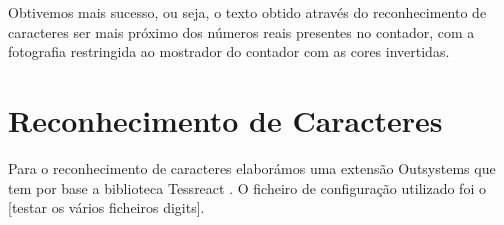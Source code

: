 Obtivemos mais sucesso, ou seja, o texto obtido através do reconhecimento de caracteres ser mais próximo dos números reais presentes no contador, com a fotografia restringida ao mostrador do contador com as cores invertidas.



\section{Reconhecimento de Caracteres} \label{sec53}

Para o reconhecimento de caracteres elaborámos uma extensão Outsystems que tem por base a biblioteca Tessreact \cite{tesseract}. O ficheiro de configuração utilizado foi o [testar os vários ficheiros digits]. 

















